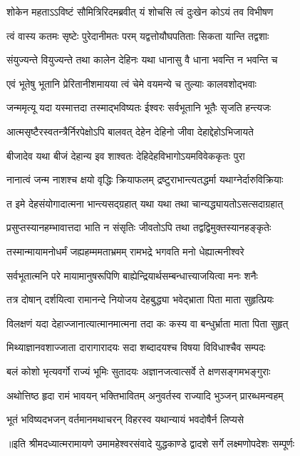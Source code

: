 


\addtocounter{shlokacount}{9}


\twolineshloka
{शोकेन महताऽऽविष्टं सौमित्रिरिदमब्रवीत्}
{यं शोचसि त्वं दुःखेन कोऽयं तव विभीषण} %

\twolineshloka
{त्वं वास्य कतमः सृष्टेः पुरेदानीमतः परम्}
{यद्वत्तोयौघपतिताः सिकता यान्ति तद्वशाः} %

\twolineshloka
{संयुज्यन्ते वियुज्यन्ते तथा कालेन देहिनः}
{यथा धानासु वै धाना भवन्ति न भवन्ति च} %

\twolineshloka
{एवं भूतेषु भूतानि प्रेरितानीशमायया}
{त्वं चेमे वयमन्ये च तुल्याः कालवशोद्भवाः} %

\twolineshloka
{जन्ममृत्यू यदा यस्मात्तदा तस्माद्भविष्यतः}
{ईश्वरः सर्वभूतानि भूतैः सृजति हन्त्यजः} %

\twolineshloka
{आत्मसृष्टैरस्वतन्त्रैर्निरपेक्षोऽपि बालवत्}
{देहेन देहिनो जीवा देहाद्देहोऽभिजायते} %

\twolineshloka
{बीजादेव यथा बीजं देहान्य इव शाश्वतः}
{देहिदेहविभागोऽयमविवेककृतः पुरा} %

\twolineshloka
{नानात्वं जन्म नाशश्च क्षयो वृद्धिः क्रियाफलम्}
{द्रष्टुराभान्त्यतद्धर्मा यथाग्नेर्दारुविक्रियाः} %

\twolineshloka
{त इमे देहसंयोगादात्मना भान्त्यसद्ग्रहात्}
{यथा यथा तथा चान्यद्ध्यायतोऽसत्सदाग्रहात्} %

\twolineshloka
{प्रसुप्तस्यानहम्भावात्तदा भाति न संसृतिः}
{जीवतोऽपि तथा तद्वद्विमुक्तस्यानहङ्कृतेः} %

\twolineshloka
{तस्मान्मायामनोधर्मं जह्यहम्ममताभ्रमम्}
{रामभद्रे भगवति मनो धेह्यात्मनीश्वरे} %

\twolineshloka
{सर्वभूतात्मनि परे मायामानुषरूपिणि}
{बाह्येन्द्रियार्थसम्बन्धात्त्याजयित्वा मनः शनैः} %

\twolineshloka
{तत्र दोषान् दर्शयित्वा रामानन्दे नियोजय}
{देहबुद्ध्या भवेद्भ्राता पिता माता सुहृत्प्रियः} %

\twolineshloka
{विलक्षणं यदा देहाज्जानात्यात्मानमात्मना}
{तदा कः कस्य वा बन्धुर्भ्राता माता पिता सुहृत्} %

\twolineshloka
{मिथ्याज्ञानवशाज्जाता दारागारादयः सदा}
{शब्दादयश्च विषया विविधाश्चैव सम्पदः} %

\twolineshloka
{बलं कोशो भृत्यवर्गो राज्यं भूमिः सुतादयः}
{अज्ञानजत्वात्सर्वे ते क्षणसङ्गमभङ्गुराः} %

\twolineshloka
{अथोत्तिष्ठ हृदा रामं भावयन् भक्तिभावितम्}
{अनुवर्तस्व राज्यादि भुञ्जन् प्रारब्धमन्वहम्} %

\twolineshloka
{भूतं भविष्यदभजन् वर्तमानमथाचरन्}
{विहरस्व यथान्यायं भवदोषैर्न लिप्यसे} %

{॥इति श्रीमदध्यात्मरामायणे उमामहेश्वरसंवादे युद्धकाण्डे द्वादशे  सर्गे  लक्ष्मणोपदेशः  सम्पूर्णः}
